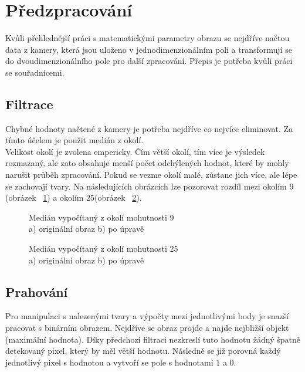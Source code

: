 \section{Předzpracování}

Kvůli přehlednější práci s matematickými parametry obrazu se nejdříve načtou data z kamery, která jsou uloženo v jednodimenzionálním poli a transformují se do dvoudimenzionálního pole pro další zpracování. Přepis je potřeba kvůli práci se souřadnicemi.\\

\subsection{Filtrace}
Chybné hodnoty načtené z kamery je potřeba nejdříve co nejvíce eliminovat. Za tímto účelem je použit medián z okolí.\\

Velikost okolí je zvolena empericky. Čím větší okolí, tím více je výsledek rozmazaný, ale zato obsahuje menší počet odchýlených hodnot, které by mohly narušit průběh zpracování. Pokud se vezme okolí malé, zůstane jich více, ale lépe se zachovají tvary. Na následujících obrázcích lze pozorovat rozdíl mezi okolím 9 (obrázek ~\ref{pic10}) a okolím 25(obrázek ~\ref{pic11}).\\

\begin{figure}[htp]
\centering
{} \hfil
{}
\caption{Medián vypočítaný z okolí mohutnosti 9 \\ a) originální obraz b) po úpravě}
\label{pic10}
\end{figure}
\begin{figure}[htp]
\centering
{} \hfil
{}
\caption{Medián vypočítaný z okolí mohutnosti 25 \\ a) originální obraz b) po úpravě}
\label{pic11}
\end{figure}

\subsection{Prahování}
Pro manipulaci s nalezenými tvary a výpočty mezi jednotlivými body je snazší pracovat s binárním obrazem. Nejdříve se obraz projde a najde nejbližší objekt (maximální hodnota). Díky předchozí filtraci nezkreslí tuto hodnotu žádný špatně detekovaný pixel, který by měl větší hodnotu. Následně se již porovná každý jednotlivý pixel s hodnotou a vytvoří se pole s hodnotami 1 a 0.

